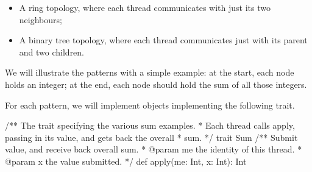 \documentclass[notes,color]{sepslide0}
\begin{document}
\begin{slide}

\begin{itemize}
\item
A ring topology, where each thread communicates with just its two neighbours;
\begin{center}
\end{center}

\item
A binary tree topology, where each thread communicates just with its parent
and two children.
\begin{center}
\end{center}
\end{itemize}
\end{slide}


\begin{slide}

We will illustrate the patterns with a simple example: at the start, each node
holds an integer; at the end, each node should hold the sum of all those
integers.

For each pattern, we will implement objects implementing the following trait. 
\begin{scala}
/** The trait specifying the various sum examples.
  * Each thread calls apply, passing in its value, and gets back the overall
  * sum. */
trait Sum{
  /** Submit value, and receive back overall sum. 
    * @param me the identity of this thread.
    * @param x the value submitted. */
  def apply(me: Int, x: Int): Int
}
\end{scala}
\end{slide}
\end{document}
